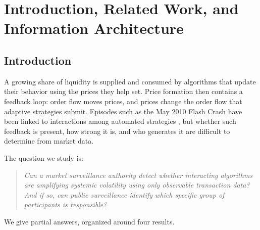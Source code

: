 \documentclass[10pt,twocolumn,letterpaper]{article}
\theoremstyle{definition}
\theoremstyle{remark}
\begin{document}
\section{Introduction, Related Work, and Information Architecture}
\label{sec:ch1}
\subsection{Introduction}
\label{sec:intro}
A growing share of liquidity is supplied and consumed by algorithms that update their behavior using the prices they help set. Price formation then contains a feedback loop: order flow moves prices, and prices change the order flow that adaptive strategies submit. Episodes such as the May 2010 Flash Crash have been linked to interactions among automated strategies \citep{kirilenko2017}, but whether such feedback is present, how strong it is, and who generates it are difficult to determine from market data.

The question we study is:
\begin{quote}
\itshape Can a market surveillance authority detect whether interacting algorithms are amplifying systemic volatility using only observable transaction data? And if so, can public surveillance identify which specific group of participants is responsible?
\end{quote}

We give partial answers, organized around four results.
\end{document}
